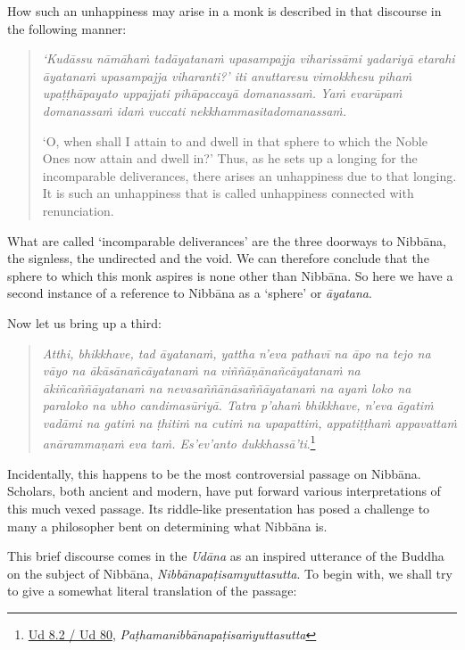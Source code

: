 How such an unhappiness may arise in a monk is described in that discourse in the following manner:

\begin{quote}
\emph{`Kudāssu nāmāhaṁ tadāyatanaṁ upasampajja viharissāmi yadariyā etarahi āyatanaṁ upasampajja viharanti?' iti anuttaresu vimokkhesu pihaṁ upaṭṭhāpayato uppajjati pihāpaccayā domanassaṁ. Yaṁ evarūpaṁ domanassaṁ idaṁ vuccati nekkhammasitadomanassaṁ.}

`O, when shall I attain to and dwell in that sphere to which the Noble Ones now attain and dwell in?' Thus, as he sets up a longing for the incomparable deliverances, there arises an unhappiness due to that longing. It is such an unhappiness that is called unhappiness connected with renunciation.
\end{quote}

What are called `incomparable deliverances' are the three doorways to Nibbāna, the signless, the undirected and the void. We can therefore conclude that the sphere to which this monk aspires is none other than Nibbāna. So here we have a second instance of a reference to Nibbāna as a `sphere' or \emph{āyatana}.

Now let us bring up a third:

\begin{quote}
\emph{Atthi, bhikkhave, tad āyatanaṁ, yattha n'eva pathavī na āpo na tejo na vāyo na ākāsānañcāyatanaṁ na viññāṇānañcāyatanaṁ na ākiñcaññāyatanaṁ na nevasaññānāsaññāyatanaṁ na ayaṁ loko na paraloko na ubho candimasūriyā. Tatra p'ahaṁ bhikkhave, n'eva āgatiṁ vadāmi na gatiṁ na ṭhitiṁ na cutiṁ na upapattiṁ, appatiṭṭhaṁ appavattaṁ anārammaṇaṁ eva taṁ. Es'ev'anto dukkhassā'ti}.\footnote{\href{https://suttacentral.net/ud8.2/pli/ms}{Ud 8.2 / Ud 80}, \emph{Paṭhamanibbānapaṭisaṁyuttasutta}}
\end{quote}

Incidentally, this happens to be the most controversial passage on Nibbāna. Scholars, both ancient and modern, have put forward various interpretations of this much vexed passage. Its riddle-like presentation has posed a challenge to many a philosopher bent on determining what Nibbāna is.

This brief discourse comes in the \emph{Udāna} as an inspired utterance of the Buddha on the subject of Nibbāna, \emph{Nibbānapaṭisamyuttasutta}. To begin with, we shall try to give a somewhat literal translation of the passage:

\enlargethispage{\baselineskip}


